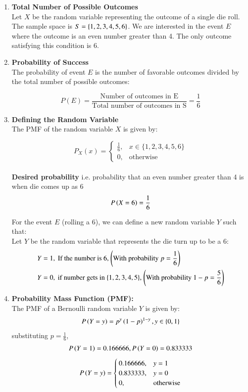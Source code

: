 \documentclass[journal]{IEEEtran}
\numberwithin{equation}{enumi}
\numberwithin{figure}{enumi}
\begin{document}
\begin{enumerate}
    \item \textbf{Total Number of Possible Outcomes}\\
    Let $X$ be the random variable representing the outcome of a single die roll. The sample space is $ S = \left\{1, 2, 3, 4, 5, 6\right\}$.  We are interested in the event $E$ where the outcome is an even number greater than 4.  The only outcome satisfying this condition is 6.

    \item \textbf{Probability of Success}\\
    The probability of event $E$ is the number of favorable outcomes divided by the total number of possible outcomes:

$$P(E) = \frac{\text{Number of outcomes in E}}{\text{Total number of outcomes in S}} = \frac{1}{6}$$
    \item \textbf{Defining the Random Variable}\\
    The PMF of the random variable $X$ is given by:

$$P_X(x) = \begin{cases}
    \frac{1}{6}, & x \in \{1, 2, 3, 4, 5, 6\} \\
    0, & \text{otherwise}
\end{cases}$$\\
\textbf{Desired probability} i.e. probability that an even number greater than 4 is when die comes up as 6 
\begin{align} 
     P\left(X = 6\right) = \frac{1}{6}
    \end{align}



For the event $E$ (rolling a 6), we can define a new random variable $Y$ such that:\\
    Let $Y$ be the random variable that represents the die turn up to be a 6:
    \begin{align}
        Y &= 1, \text{ If the number is 6, \ensuremath{\left(\text{With probability }p = \frac{1}{6}\right)}}\\
        Y &= 0, \text{ if number gets in \ensuremath{\left\{1,2,3,4,5\right\}}, \ensuremath{\left(\text{With probability } 1 -p = \frac{5}{6}\right)}}
    \end{align}
    \item \textbf{Probability Mass Function (PMF):}\\
    The PMF  of a Bernoulli random variable $Y$ is given by:
    \begin{align}
	P\left(Y = y\right) = p^y\left(1 - p\right)^{1 - y}, y \in \left\{0,1\right\}
    \end{align}
    substituting $p = \frac{1}{6}$,\\
    \begin{align}
     P\left(Y = 1\right) = 0.166666, P\left(Y = 0\right) = 0.833333
    \end{align}
    \begin{align}
    	P\left(Y = y\right) = \begin{cases}
    		0.166666, & y = 1 \\
    		0.833333, & y = 0 \\
    		0, & \text{otherwise}
    	\end{cases}
    \end{align}


\end{enumerate}
\end{document}
